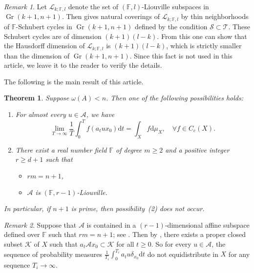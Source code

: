 \documentclass[12pt,reqno]{amsart}
\newcommand{\Gr}{\operatorname{Gr}}
\numberwithin{equation}{section}
\theoremstyle{plain}
\newtheorem{thm}{Theorem}[section]
\theoremstyle{definition}
\theoremstyle{remark}
\newtheorem{remark}{Remark}[section]
\newcommand\bbF{\mathbb{F}}
\newcommand\cA{\mathcal{A}}
\newcommand\cK{\mathcal{K}}
\newcommand\cL{\mathcal{L}}
\newcommand\cS{\mathcal{S}}
\newcommand\cT{\mathcal{T}}
\newcommand{\de}{\mathrm{d}}
\begin{document}
    \begin{remark} \label{rem:H-dim-F-Liouville}
        Let $\cL_{k;\bbF,l}$ denote the set of $(\bbF,l)$-Liouville subspaces in $\Gr(k+1,n+1)$. Then  gives natural coverings of $\cL_{k;\bbF,l}$ by thin neighborhoods of $\bbF$-Schubert cycles in $\Gr(k+1,n+1)$ defined by the condition $\cS\subset\cT$. These Schubert cycles are of dimension $(k+1)(l-k)$. From this one can show that the Hausdorff dimension of $\cL_{k;\bbF,l}$ is $(k+1)(l-k)$, which is strictly smaller than the dimension of $\Gr(k+1,n+1)$. Since this fact is not used in this article, we leave it to the reader to verify the details.
    \end{remark}
    
	The following is the main result of this article.
	
	\begin{thm}  \label{thm:main_equidistribution}
		Suppose $\omega(A)<n$. Then one of the following possibilities holds:
		\begin{enumerate}
			\item \label{item:equidistribution} For almost every $u\in\mathcal{A}$, we have
			\begin{equation*}
			\lim_{T\to\infty}\frac{1}{T}\int_{0}^{T}f(a_tux_0)\de t =
			\int_{X} f \de\mu_{X},\quad\forall f\in C_c(X).
			\end{equation*}
			\item \label{item:algebraic obstruction} There exist a real number field $\bbF$ of degree $m\geq 2$ and a positive integer $r\geq d+1$ such that
			\begin{itemize}
				\item $rm=n+1$,
				\item $\mathcal{A}$ is $(\bbF, r-1)$-Liouville.
			\end{itemize}
		\end{enumerate}
        In particular, if $n+1$ is prime, then possibility~(2) does not occur. 
	\end{thm}

\begin{remark} \label{rem:AinT}
    Suppose that $\mathcal{A}$ is contained in a $(r-1)$-dimensional affine subspace defined over $\bbF$ such that $rm=n+1$; see . Then by \cite[Proof of Lemma~6.6]{SY24PLMS}, there exists a proper closed subset $\cK$ of $X$ such that $a_t\mathcal{A}x_0\subset \cK$ for all $t\geq 0$. So for every $u\in\cA$, the sequence of probability measures $\frac{1}{T_i}\int_{0}^{T_i}a_tu\delta_{x_0}\de t$ do not equidistribute in $X$ for any sequence $T_i\to\infty$. 
    \end{remark}
\end{document}
